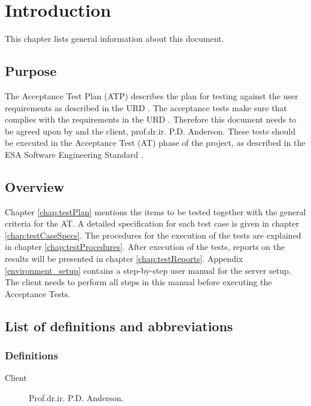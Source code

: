 \chapter{Introduction}
\label{chap:intro}
This chapter lists general information about this document.

\section{Purpose}
\label{sec:purpose}
The Acceptance Test Plan (ATP) describes the plan for testing \projectname{} against the user requirements as described in the URD \cite{urd}. The acceptance tests make sure that
\projectname{} complies with the requirements in the URD \cite{urd}. Therefore this document needs to be agreed upon by \projectauthor{} and the client, prof.dr.ir. P.D. Anderson.
These tests should be executed in the Acceptance Test (AT) phase of the \projectname{} project, as described in the ESA Software Engineering Standard \cite{esa}.

\section{Overview}
\label{sec:overview}
Chapter \ref{chap:testPlan} mentions the items to be tested together with the general criteria for the AT. A detailed specification for each test case is given in chapter \ref{chap:testCaseSpecs}. The procedures for the execution of the tests are explained in chapter \ref{chap:testProcedures}. After execution of the tests, reports on the results will be presented in chapter \ref{chap:testReports}.
Appendix \ref{environment_setup} contains a step-by-step user manual for the server setup. The client needs to perform all steps in this manual before executing the Acceptance Tests.

\section{List of definitions and abbreviations}
\label{sec:listofdef}

\subsection{Definitions}
\label{subsec:def}

\begin{description}
\item[Client] Prof.dr.ir. P.D. Anderson.
\end{description}

